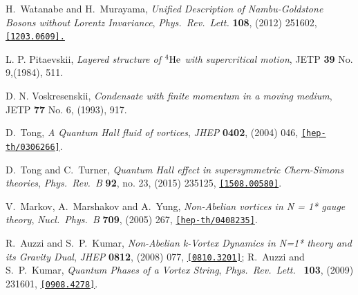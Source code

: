 \begin{thebibliography}{99}
  H.~Watanabe and H.~Murayama,
  {\it Unified Description of Nambu-Goldstone Bosons without Lorentz Invariance},
  {\it Phys.\ Rev.\ Lett.}  {\bf 108},  (2012) 251602, 
  \href{https://arxiv.org/abs/1203.0609}{\tt[1203.0609].}
  
  L. P. Pitaevskii, {\it Layered structure of ${}^4{\rm He}$ with supercritical motion}, {JETP} {\bf 39} No. 9,(1984), 511.
  
  D. N. Voskresenskii, {\it Condensate with finite momentum in a moving medium}, {JETP} {\bf 77} No. 6, (1993), 917.
  
  D.~Tong,
  {\it A Quantum Hall fluid of vortices},
  {\it JHEP} {\bf 0402}, (2004) 046, 
  \href{https://arxiv.org/abs/hep-th/0306266}{\tt[hep-th/0306266]}.
  
  
  D.~Tong and C.~Turner,
  {\it Quantum Hall effect in supersymmetric Chern-Simons theories},
  {\it Phys.\ Rev.\ B} {\bf 92}, no. 23,  (2015) 235125,
  \href{https://arxiv.org/abs/1508.00580}{\tt[1508.00580]}.
  
  V.~Markov, A.~Marshakov and A.~Yung,
  {\it Non-Abelian vortices in N = 1* gauge theory},
  {\it Nucl.\ Phys.\ B} {\bf 709},  (2005) 267,
  \href{https://arxiv.org/abs/hep-th/0408235}{\tt[hep-th/0408235]}.
  
  R.~Auzzi and S.~P.~Kumar,
  {\it Non-Abelian k-Vortex Dynamics in N=1* theory and its Gravity Dual},
  {\it JHEP} {\bf 0812}, (2008) 077, 
  \href{https://arxiv.org/abs/0810.3201}{\tt[0810.3201]};
  R.~Auzzi and S.~P.~Kumar,
  {\it Quantum Phases of a Vortex String},
  {\it Phys.\ Rev.\ Lett.\ }  {\bf 103},  (2009) 231601,
  \href{https://arxiv.org/abs/0908.4278}{\tt[0908.4278]}.
  

\end{thebibliography}
